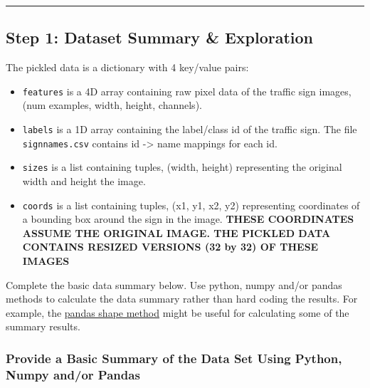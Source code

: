 \documentclass[11pt]{article}
\providecommand{\tightlist}{%
      \setlength{\itemsep}{0pt}\setlength{\parskip}{0pt}}
\begin{document}
    \begin{center}\rule{0.5\linewidth}{\linethickness}\end{center}

\hypertarget{step-1-dataset-summary-exploration}{%
\subsection{Step 1: Dataset Summary \&
Exploration}\label{step-1-dataset-summary-exploration}}

The pickled data is a dictionary with 4 key/value pairs:

\begin{itemize}
\tightlist
\item
  \texttt{\textquotesingle{}features\textquotesingle{}} is a 4D array
  containing raw pixel data of the traffic sign images, (num examples,
  width, height, channels).
\item
  \texttt{\textquotesingle{}labels\textquotesingle{}} is a 1D array
  containing the label/class id of the traffic sign. The file
  \texttt{signnames.csv} contains id -\textgreater{} name mappings for
  each id.
\item
  \texttt{\textquotesingle{}sizes\textquotesingle{}} is a list
  containing tuples, (width, height) representing the original width and
  height the image.
\item
  \texttt{\textquotesingle{}coords\textquotesingle{}} is a list
  containing tuples, (x1, y1, x2, y2) representing coordinates of a
  bounding box around the sign in the image. \textbf{THESE COORDINATES
  ASSUME THE ORIGINAL IMAGE. THE PICKLED DATA CONTAINS RESIZED VERSIONS
  (32 by 32) OF THESE IMAGES}
\end{itemize}

Complete the basic data summary below. Use python, numpy and/or pandas
methods to calculate the data summary rather than hard coding the
results. For example, the
\href{http://pandas.pydata.org/pandas-docs/stable/generated/pandas.DataFrame.shape.html}{pandas
shape method} might be useful for calculating some of the summary
results.

    \hypertarget{provide-a-basic-summary-of-the-data-set-using-python-numpy-andor-pandas}{%
\subsubsection{Provide a Basic Summary of the Data Set Using Python,
Numpy and/or
Pandas}\label{provide-a-basic-summary-of-the-data-set-using-python-numpy-andor-pandas}}
\end{document}
